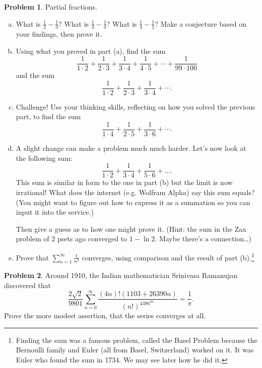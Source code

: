 \documentclass[11pt,oneside]{amsart}
\theoremstyle{definition}
\newtheorem{problem}{Problem}
\theoremstyle{plain}
\begin{document}
\begin{problem}
Partial fractions.
\leavevmode\begin{enumerate}[(a)]
  \item What is $\frac 12-\frac 13$? What is $\frac 13-\frac 14$? What is $\frac 14-\frac 15$? Make a conjecture based on your findings, then prove it.
  \item Using what you proved in part (a), find the sum
        \[\frac 1{1\cdot 2}+\frac 1{2\cdot3 }+\frac 1{3\cdot 4}+\frac 1{4\cdot 5}+\cdots+\frac 1{99\cdot 100}\]
        and the sum
        \[\frac 1{1\cdot 2}+\frac 1{2\cdot3 }+\frac 1{3\cdot 4}+\cdots.\]
  \item Challenge! Use your thinking skills, reflecting on how you solved the previous part, to find the sum
        \[\frac1{1\cdot 4}+\frac 1{2\cdot 5}+\frac 1{3\cdot 6}+\cdots.\]
  \item A slight change can make a problem much much harder. Let's now look at the following sum:
        \[\frac 1{1\cdot 2}+\frac 1{3\cdot 4}+\frac 1{5\cdot 6}+\dots.\]
        This sum is similar in form to the one in part (b) but the limit is now irrational! What does the internet (e.g. Wolfram Alpha) say this sum equals? (You might want to figure out how to express it as a summation so you can input it into the service.)

        Then give a guess as to how one might prove it. (Hint: the sum in the Zax problem of 2 psets ago converged to $1-\ln 2$. Maybe there's a connection\ldots)
  \item Prove that $\displaystyle\sum_{n=1}^\infty \frac 1{n^2}$ converges, using comparison and the result of part (b).\footnote{Finding the sum was a famous problem, called the
          Basel Problem because the Bernoulli family and Euler (all from Basel, Switzerland) worked
          on it. It was Euler who found the sum in 1734. We may see later how he did it.}
\end{enumerate}
\end{problem}

\begin{problem}
Around 1910, the Indian mathematician Srinivasa Ramanujan discovered that
\[
  \frac{2\sqrt{2}}{9801}\sum_{n=0}^\infty\frac{(4n)!(1103+26390n)}{(n!)^4396^{4n}}=\frac{1}{\pi}.
\]
Prove the more modest assertion, that the series converges at all.

\end{problem}
\end{document}
